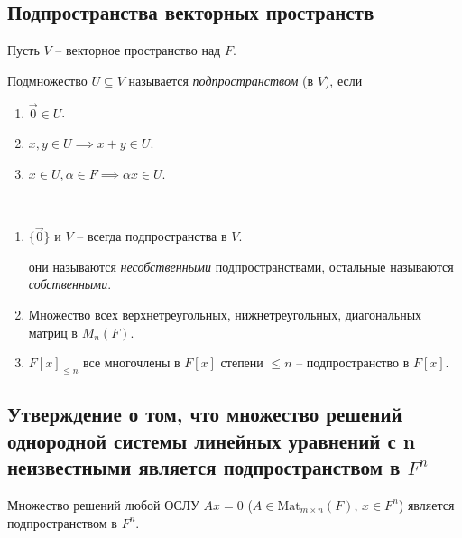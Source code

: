 \subsection{Подпространства векторных пространств}


Пусть $V$ -- векторное пространство над $F$.

\begin{definition}
    Подмножество $U \subseteq V$ называется \textit{подпространством} (в $V$), если
    \begin{enumerate}[nosep]
    \item $\overrightarrow{0} \in U$.
    \item $x, y \in U \implies x + y \in U$.
    \item $x \in U, \alpha \in F \implies \alpha x \in U$.
    \end{enumerate}
\end{definition}

\begin{comment}
    Всякое подпространство само является векторным пространством относительно тех же операций.
\end{comment}

\begin{example}~
    \begin{enumerate}
        \item $\{\overrightarrow{0}\}$ и $V$ -- всегда подпространства в $V$.

            они называются \textit{несобственными} подпространствами, остальные называются \textit{собственными}.

        \item Множество всех верхнетреугольных, нижнетреугольных, диагональных матриц в $M_n(F)$.

        \item $F[x]_{\leq n}$ все многочлены в $F[x]$ степени $\leq n$ -- подпространство в $F[x]$.
    \end{enumerate}
\end{example}


\subsection{Утверждение о том, что множество решений однородной системы линейных уравнений с n неизвестными является подпространством в $F^n$}

\begin{proposal}
    Множество решений любой ОСЛУ $Ax = 0$ ($A \in \text{Mat}_{m \times n}(F)$, $x \in F^n$) является подпространством в $F^n$.
\end{proposal}

